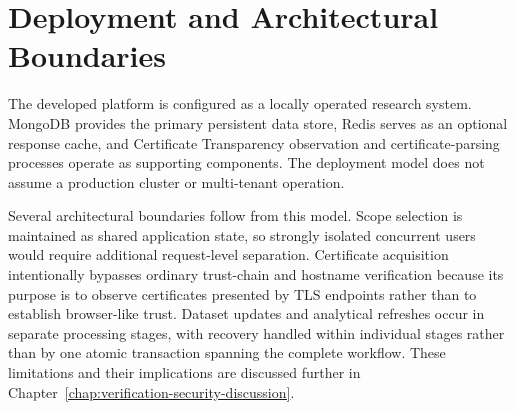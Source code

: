 \section{Deployment and Architectural Boundaries}
\label{sec:architectural-constraints}

The developed platform is configured as a locally operated research system.
MongoDB provides the primary persistent data store, Redis serves as an optional
response cache, and Certificate Transparency observation and certificate-parsing
processes operate as supporting components. The deployment model does not
assume a production cluster or multi-tenant operation.

Several architectural boundaries follow from this model. Scope selection is
maintained as shared application state, so strongly isolated concurrent users
would require additional request-level separation. Certificate acquisition
intentionally bypasses ordinary trust-chain and hostname verification because
its purpose is to observe certificates presented by TLS endpoints rather than
to establish browser-like trust. Dataset updates and analytical refreshes occur
in separate processing stages, with recovery handled within individual stages
rather than by one atomic transaction spanning the complete workflow. These
limitations and their implications are discussed further in
Chapter~\ref{chap:verification-security-discussion}.
